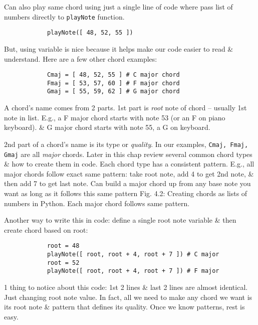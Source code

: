 \documentclass{article}
\begin{document}
\begin{itemize}
\begin{itemize}
		Can also play same chord using just a single line of code where pass list of numbers directly to {\tt playNote} function.
		\begin{verbatim}
			playNote([ 48, 52, 55 ])
		\end{verbatim}
		But, using variable is nice because it helps make our code easier to read \& understand. Here are a few other chord examples:
		\begin{verbatim}
			Cmaj = [ 48, 52, 55 ] # C major chord
			Fmaj = [ 53, 57, 60 ] # F major chord
			Gmaj = [ 55, 59, 62 ] # G major chord
		\end{verbatim}
		A chord's name comes from 2 parts. 1st part is {\it root} note of chord -- usually 1st note in list. E.g., a F major chord starts with note 53 (or an F on piano keyboard). \& G major chord starts with note 55, a G on keyboard.
		
		2nd part of a chord's name is its type or {\it quality}. In our examples, {\tt Cmaj, Fmaj, Gmaj} are all {\it major} chords. Later in this chap review several common chord types \& how to create them in code. Each chord type has a consistent pattern. E.g., all major chords follow exact same pattern: take root note, add 4 to get 2nd note, \& then add 7 to get last note. Can build a major chord up from any base note you want as long as it follows this same pattern {\sf Fig. 4.2: Creating chords as lists of numbers in Python. Each major chord follows same pattern.}
		
		Another way to write this in code: define a single root note variable \& then create chord based on root:
		\begin{verbatim}
			root = 48
			playNote([ root, root + 4, root + 7 ]) # C major
			root = 52
			playNote([ root, root + 4, root + 7 ]) # F major
		\end{verbatim}
		1 thing to notice about this code: 1st 2 lines \& last 2 lines are almost identical. Just changing root note value. In fact, all we need to make any chord we want is its root note \& pattern that defines its quality. Once we know patterns, rest is easy.
		

\end{itemize}
\end{itemize}
\end{document}
